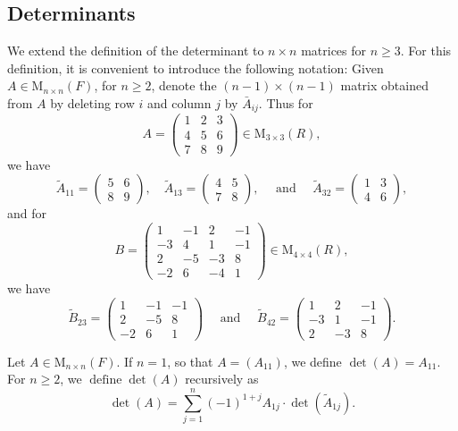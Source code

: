 \documentclass{report}
\begin{document}
    \subsection*{Determinants}
    We extend the definition of the determinant to $n \times n$ matrices for $n \geq 3$. For this definition, it is convenient to introduce the following notation: Given $A \in \mathrm{M}_{n \times n}(F)$, for $n \geq 2$, denote the $(n-1) \times(n-1)$ matrix obtained from $A$ by deleting row $i$ and column $j$ by $\bar{A}_{i j}$. Thus for
    $$
    A=\left(\begin{array}{lll}
    1 & 2 & 3 \\
    4 & 5 & 6 \\
    7 & 8 & 9
    \end{array}\right) \in \mathrm{M}_{3 \times 3}(R),
    $$
    we have
    $$
    \tilde{A}_{11}=\left(\begin{array}{ll}
    5 & 6 \\
    8 & 9
    \end{array}\right), \quad \tilde{A}_{13}=\left(\begin{array}{ll}
    4 & 5 \\
    7 & 8
    \end{array}\right), \quad \text { and } \quad \tilde{A}_{32}=\left(\begin{array}{ll}
    1 & 3 \\
    4 & 6
    \end{array}\right),
    $$
    and for
    $$
    B=\left(\begin{array}{rrrr}
    1 & -1 & 2 & -1 \\
    -3 & 4 & 1 & -1 \\
    2 & -5 & -3 & 8 \\
    -2 & 6 & -4 & 1
    \end{array}\right) \in \mathrm{M}_{4 \times 4}(R),
    $$
    we have
    $$
    \tilde{B}_{23}=\left(\begin{array}{rrr}
    1 & -1 & -1 \\
    2 & -5 & 8 \\
    -2 & 6 & 1
    \end{array}\right) \quad \text { and } \quad \tilde{B}_{42}=\left(\begin{array}{rrr}
    1 & 2 & -1 \\
    -3 & 1 & -1 \\
    2 & -3 & 8
    \end{array}\right) .
    $$

    \begin{defBox}
        Let $A \in \mathrm{M}_{n \times n}(F)$. If $n=1$, so that $A=\left(A_{11}\right)$, we define $\operatorname{det}(A)=A_{11}$. For $n \geq 2$, we $\operatorname{define} \operatorname{det}(A)$ recursively as
        $$
        \operatorname{det}(A)=\sum_{j=1}^n(-1)^{1+j} A_{1 j} \cdot \operatorname{det}\left(\tilde{A}_{1 j}\right) .
        $$
    \end{defBox}
\end{document}
